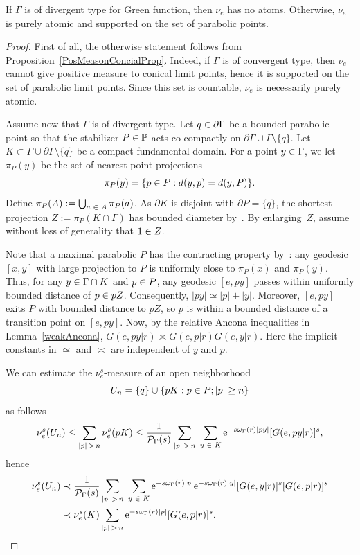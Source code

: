 \documentclass[AHL,Unicode,longabstracts]{cedram}
\newcommand{\pG}{\partial{\Gamma}}
\newcommand{\bbP}{\mathbb{P}}
\newcommand{\rme}{\mathrm{e}}
\newcommand{\clP}{\mathcal{P}}
\let\oldin\in
\renewcommand{\in}{\mathchoice{\oldin}{\oldin}{\,\oldin\,}{\,\oldin\,}}
\let\oldge\ge
\renewcommand{\ge}{\mathchoice{\oldge}{\oldge}{\,\oldge\,}{\,\oldge\,}}
\let\oldle\le
\renewcommand{\le}{\mathchoice{\oldle}{\oldle}{\,\oldle\,}{\,\oldle\,}}
\begin{document}
\begin{theo}\label{divergencetypeandatoms}
If $\Gamma$ is of divergent type for Green function, then $\nu_e$ has no atoms. Otherwise, $\nu_e$ is purely atomic and supported on the set of parabolic points.
\end{theo}
\begin{proof}
First of all, the otherwise statement follows from Proposition~\ref{PosMeasonConcialProp}. Indeed, if $\Gamma$ is of convergent type, then $\nu_e$ cannot give positive measure to conical limit points, hence it is supported on the set of parabolic limit points. Since this set is countable, $\nu_e$ is necessarily purely atomic.

Assume now that $\Gamma$ is of divergent type. Let $q\in \pG$ be a bounded parabolic point so that the stabilizer $P\in \bbP$ acts co-compactly on $\pG\cup \Gamma \setminus \{q\}$. Let $K\subset \Gamma\cup\pG\setminus \{q\}$ be a compact fundamental domain.
For a point $y\in \Gamma$, we let $\pi_P(y)$ be the set of nearest point-projections
\[
\pi_P(y)=\{p\in P: d(y,p)=d(y,P)\}.
\]
Define $\pi_P(A):=\bigcup_{a\in A} \pi_P(a)$. As $\partial K$ is disjoint with $\partial P=\{q\}$, the shortest projection $Z:=\pi_P(K\cap \Gamma)$ has bounded diameter by~\cite[Proposition~3.3]{GP16}. By enlarging~$Z$, assume without loss of generality that $1\in Z$.

Note that a maximal parabolic $P$ has the contracting property by~\cite[Proposition~8.5]{GP16}: any geodesic $[x,y]$ with large projection to $P$ is uniformly close to $\pi_P(x)$ and $\pi_P(y)$. Thus, for any $y\in \Gamma\cap K$ and $p\in P$, any geodesic $[e,py]$ passes within uniformly bounded distance of $p\in pZ$. Consequently, $|p y| \simeq |p| + |y|$. Moreover, $[e,py]$ exits $P$ with bounded distance to $pZ$, so $p$ is within a bounded distance of a transition point on $[e,py]$. Now, by the relative Ancona inequalities in Lemma~\ref{weakAncona}, $G(e, p y|r) \asymp G(e, p|r) G(e, y|r)$. Here the implicit constants in $\simeq$ and $\asymp$ are independent of $y$ and $p$.



We can estimate the $\nu_e^s$-measure of an open neighborhood
\[
U_n= \{q\}\cup \{pK: p\in P; |p|\ge n\}
\]
as follows
\[
\nu_e^s(U_n) \le \sum_{|p|\,>\,n} \nu_e^s(pK) \le {\frac{1}{\clP_{\Gamma}(s)}} \sum_{|p|\,>\,n}\; \sum_{y\in K} \rme^{-s\omega_\Gamma(r)|p y|} [G(e, p y|r)]^s,
\]
hence
\begin{align*}
\nu_e^s(U_n) &\prec {\frac{1}{\clP_{\Gamma}(s)}} \sum_{|p|\,>\,n}\;\sum_{y\in K} \rme^{-s\omega_\Gamma(r)|p|} \rme^{-s\omega_\Gamma(r)|y|} [G(e,y|r)]^s [G(e,p|r)]^s\\
&\prec \nu_e^s(K) \sum_{|p|\,>\,n} \rme^{-s\omega_\Gamma(r) |p|} [G(e,p|r)]^s.
\end{align*}



\end{proof}
\end{document}
